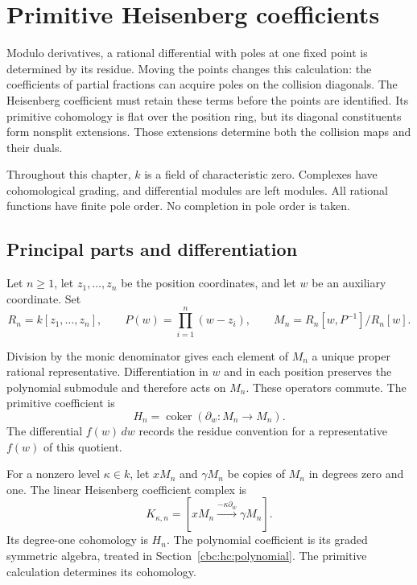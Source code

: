 \chapter{Primitive Heisenberg coefficients}
\label{cbc:chap:heisenberg}

Modulo derivatives, a rational differential with poles at one fixed
point is determined by its residue. Moving the points changes this calculation: the
coefficients of partial fractions can acquire poles on the collision
diagonals. The Heisenberg coefficient must retain these terms before
the points are identified. Its primitive cohomology is flat over the
position ring, but its diagonal constituents form nonsplit extensions.
Those extensions determine both the collision maps and their duals.

Throughout this chapter, $k$ is a field of characteristic zero.
Complexes have cohomological grading, and differential modules are
left modules. All rational functions have finite pole order. No
completion in pole order is taken.

\section{Principal parts and differentiation}
\label{cbc:hc:principal-parts}

Let $n\geq1$, let $z_1,\ldots,z_n$ be the position coordinates, and
let $w$ be an auxiliary coordinate. Set
\begin{equation}\label{cbc:hc:poles}
 R_n=k[z_1,\ldots,z_n],\qquad
 P(w)=\prod_{i=1}^n(w-z_i),\qquad
 M_n=R_n[w,P^{-1}]/R_n[w].
\end{equation}

Division by the monic denominator gives each element of $M_n$ a
unique proper rational representative. Differentiation in $w$ and
in each position preserves the polynomial submodule and therefore
acts on $M_n$. These operators commute. The primitive coefficient is
\begin{equation}\label{cbc:hc:primitive}
 H_n=\operatorname{coker}(\partial_w:M_n\longrightarrow M_n).
\end{equation}
The differential $f(w)\,dw$ records the residue convention for a
representative $f(w)$ of this quotient.

For a nonzero level $\kappa\in k$, let $xM_n$ and $\gamma M_n$
be copies of $M_n$ in degrees zero and one. The linear
Heisenberg coefficient complex is
\begin{equation}\label{cbc:hc:linear-complex}
 K_{\kappa,n}=[xM_n\xrightarrow{-\kappa\partial_w}\gamma M_n].
\end{equation}
Its degree-one cohomology is $H_n$. The polynomial coefficient
is its graded symmetric algebra, treated in
Section~\ref{cbc:hc:polynomial}. The primitive calculation
determines its cohomology.


